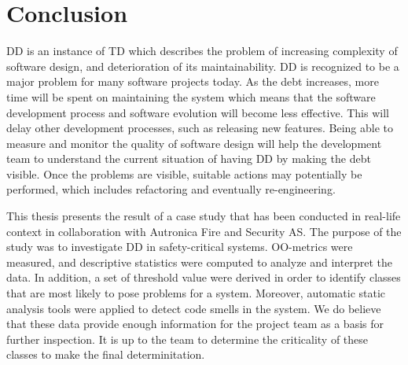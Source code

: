 
\chapter{Conclusion}
\label{chap:conclusion}


DD is an instance of TD which describes the problem of increasing complexity of software design, and deterioration of its maintainability. DD is recognized to be a major problem for many software projects today. As the debt increases, more time will be spent on maintaining the system which means that the software development process and software evolution will become less effective. This will delay other development processes, such as releasing new features. Being able to measure and monitor the quality of software design will help the development team to understand the current situation of having DD by making the debt visible. Once the problems are visible, suitable actions may potentially be performed, which includes refactoring and eventually re-engineering. 


This thesis presents the result of a case study that has been conducted in real-life context in collaboration with Autronica Fire and Security AS. The purpose of the study was to investigate DD in safety-critical systems. OO-metrics were measured, and descriptive statistics were computed to analyze and interpret the data. In addition, a set of threshold value were derived in order to identify classes that are most likely to pose problems for a system. Moreover, automatic static analysis tools were applied to detect code smells in the system. We do believe that these data provide enough information for the project team as a basis for further inspection. It is up to the team to determine the criticality of these classes to make the final determinitation.

